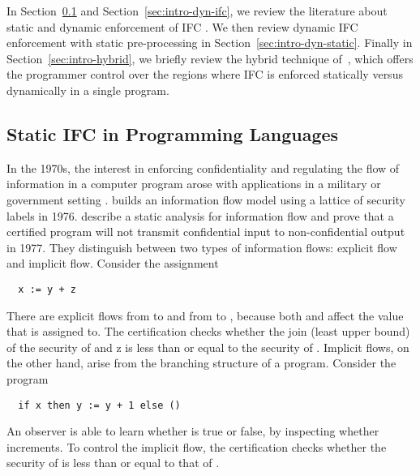 In Section~\ref{sec:intro-static-ifc} and Section~\ref{sec:intro-dyn-ifc}, we
review the literature about static and dynamic enforcement of IFC . We then
review dynamic IFC enforcement with static pre-processing in
Section~\ref{sec:intro-dyn-static}. Finally in Section~\ref{sec:intro-hybrid},
we briefly review the hybrid technique of~\textcite{Buiras:2015aa}, which offers
the programmer control over the regions where IFC is enforced statically versus
dynamically in a single program.

\subsection{Static IFC in Programming Languages}
\label{sec:intro-static-ifc}

In the 1970s, the interest in enforcing confidentiality and regulating the flow
of information in a computer program arose with applications in a military or
government setting \autocite{bell1976secure,lester2016information}.
\textcite{denning1976lattice} builds an information flow model using a lattice
of security labels in 1976. \textcite{denning1977certification} describe a
static analysis for information flow and prove that a certified program will not
transmit confidential input to non-confidential output in 1977. They distinguish
between two types of information flows: explicit flow and implicit flow.
Consider the assignment
\begin{verbatim}
  x := y + z
\end{verbatim}
\noindent There are explicit flows from  to  and from  to
, because both  and  affect the value that  is
assigned to. The certification checks whether the join (least upper bound) of
the security of  and {z} is less than or equal to the security of
. Implicit flows, on the other hand, arise from the branching structure
of a program. Consider the program
\begin{verbatim}
  if x then y := y + 1 else ()
\end{verbatim}
\noindent An observer is able to learn whether  is true or false, by inspecting
whether  increments. To control the implicit flow, the certification
checks whether the security of  is less than or equal to that of .

